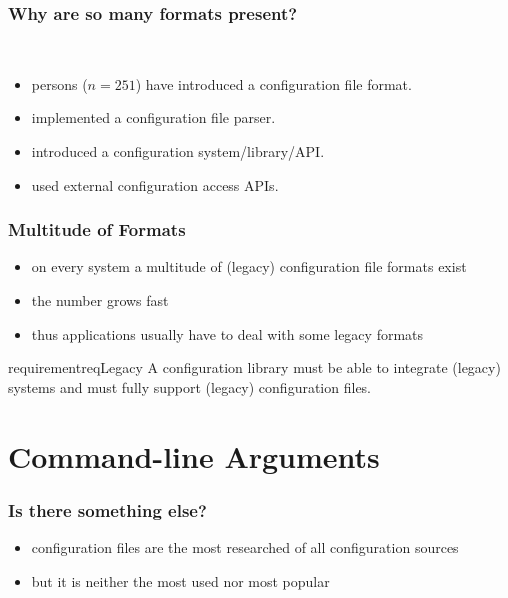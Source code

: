 \begin{frame}
	\frametitle{Why are so many formats present?}
	\methodQuestion{} ~\cite{raab2017challenges}
	\begin{itemize}
	\item {} persons ($n=251$) have introduced a configuration file format.
	\item {} implemented a configuration file parser.
	\item {} introduced a configuration system/library/API.
	\item {} used external configuration access APIs.
	\end{itemize}
\end{frame}

\begin{frame}
	\frametitle{Multitude of Formats}
	\begin{itemize}
	\item on every system a multitude of (legacy) configuration file formats exist
	\item the number grows fast
	\item thus applications usually have to deal with some legacy formats
	\end{itemize}
	

	\begin{restatable}{requirement}{reqLegacy}
	A configuration library must be able to integrate (legacy) systems and must fully support (legacy) configuration files.%
	\label{req:legacy}
	\end{restatable}
\end{frame}





\section{Command-line Arguments}

\begin{frame}
	\frametitle{Is there something else?}
	\begin{itemize}
	\item configuration files are the most researched of all configuration sources~\cite{jin2014configurations}
	\item but it is neither the most used nor most popular~\cite{raab2017challenges}
	\end{itemize}
\end{frame}


